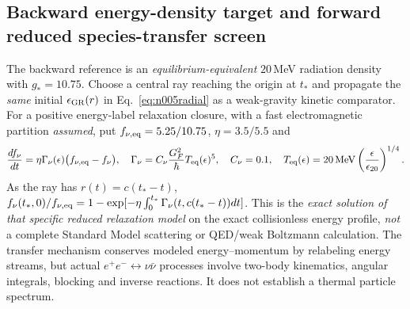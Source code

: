 \documentclass[11pt,a4paper]{article}
\theoremstyle{tmon}
\theoremstyle{definition}
\begin{document}
\subsection{Backward energy-density target and forward reduced species-transfer screen}
The backward reference is an \emph{equilibrium-equivalent} $20\,$MeV radiation density with $g_*=10.75$. Choose a central ray reaching the origin at $t_*$ and propagate the \emph{same} initial $\epsilon_{\rm GR}(r)$ in Eq.~\eqref{eq:n005radial} as a weak-gravity kinetic comparator. For a positive energy-label relaxation closure, with a fast electromagnetic partition \emph{assumed}, put $f_{\nu,\rm eq}=5.25/10.75$, $\eta=3.5/5.5$ and
\begin{equation}\label{eq:n005rate}
\frac{df_\nu}{dt}=\eta\Gamma_\nu(\epsilon)\big(f_{\nu,\rm eq}-f_\nu\big),\quad
\Gamma_\nu=C_\nu\frac{G_F^2}{\hbar}T_{\rm eq}(\epsilon)^5,\quad C_\nu=0.1,\quad
T_{\rm eq}(\epsilon)=20\,\mathrm{MeV}\left(\frac{\epsilon}{\epsilon_{20}}\right)^{1/4}.
\end{equation}
As the ray has $r(t)=c(t_*-t)$, $f_\nu(t_*,0)/f_{\nu,\rm eq}=1-\exp[-\eta\int_0^{t_*}\Gamma_\nu(t,c(t_*-t))dt]$. This is the \emph{exact solution of that specific reduced relaxation model} on the exact collisionless energy profile, \emph{not} a complete Standard Model scattering or QED/weak Boltzmann calculation. The transfer mechanism conserves modeled energy--momentum by relabeling energy streams, but actual $e^+e^-\leftrightarrow\nu\bar\nu$ processes involve two-body kinematics, angular integrals, blocking and inverse reactions. It does not establish a thermal particle spectrum.
\end{document}
